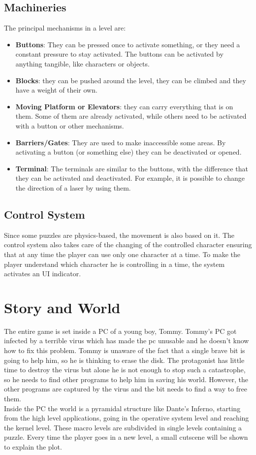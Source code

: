 \documentclass[12pt, a4paper]{report}
\begin{document}
\section*{Machineries}
The principal mechanisms in a level are:
\begin{itemize}
	\item \textbf{Buttons}: They can be pressed once to activate something, or they need a constant pressure to stay activated. The buttons can be activated 	by anything tangible, like characters or objects.
	\item \textbf{Blocks}: they can be pushed around the level, they can be climbed and they have a weight of their own.
	\item \textbf{Moving Platform or Elevators}: they can carry everything that is on them. Some of them are already activated, while others need to be 			activated with a button or other mechanisms.
	\item \textbf{Barriers/Gates}: They are used to make inaccessible some areas. By activating a button (or something else) they can be deactivated or 			opened.
	\item \textbf{Terminal}: The terminals are similar to the buttons, with the difference that they can be activated and deactivated. For example, it is 			possible to change the direction of a laser by using them.
\end{itemize}

\section*{Control System}
Since some puzzles are physics-based, the movement is also based on it. The control system also takes care of the changing of the controlled character ensuring that at any time the player can use only one character at a time. To make the player understand which character he is controlling in a time, the system activates an UI indicator.



\chapter{Story and World}
The entire game is set inside a PC of a young boy, Tommy. Tommy’s PC got infected by a terrible virus which has made the pc unusable and he doesn’t know how to fix this problem. Tommy is unaware of the fact that a single brave bit is going to help him, so he is thinking to erase the disk. The protagonist has little time to destroy the virus but alone he is not enough to stop such a catastrophe, so he needs to find other programs to help him in saving his world. However, the other programs are captured by the virus and the bit needs to find a way to free them.\\
Inside the PC the world is a pyramidal structure like Dante’s Inferno, starting from the high level applications, going in the operative system level and reaching the kernel level. These macro levels are subdivided in single levels containing a puzzle.  Every time the player goes in a new level, a small cutscene will be shown to explain the plot.
\end{document}
